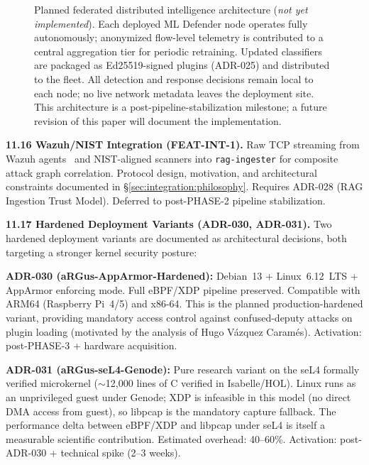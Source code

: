 \documentclass[11pt,a4paper]{article}
\begin{document}
\begin{figure}[ht]
        \caption{Planned federated distributed intelligence architecture (\emph{not yet implemented}).
        Each deployed ML Defender node operates fully autonomously; anonymized flow-level telemetry
        is contributed to a central aggregation tier for periodic retraining. Updated classifiers
        are packaged as Ed25519-signed plugins (ADR-025) and distributed to the fleet. All detection
        and response decisions remain local to each node; no live network metadata leaves the
        deployment site. This architecture is a post-pipeline-stabilization milestone; a future
        revision of this paper will document the implementation.}
        \label{fig:federated}
    \end{figure}

    \textbf{11.16 Wazuh/NIST Integration (FEAT-INT-1).}
    Raw TCP streaming from Wazuh agents~\cite{wazuh2024} and NIST-aligned
    scanners into \texttt{rag-ingester} for composite attack graph correlation.
    Protocol design, motivation, and architectural constraints documented in
    \S\ref{sec:integration:philosophy}. Requires ADR-028 (RAG Ingestion Trust
    Model). Deferred to post-PHASE-2 pipeline stabilization.

    \textbf{11.17 Hardened Deployment Variants (ADR-030, ADR-031).}
    \label{sec:future:hardened}
    Two hardened deployment variants are documented as architectural decisions, both
    targeting a stronger kernel security posture:

    \textbf{ADR-030 (aRGus-AppArmor-Hardened):} Debian~13 + Linux~6.12~LTS +
    AppArmor enforcing mode. Full eBPF/XDP pipeline preserved. Compatible with ARM64
    (Raspberry Pi~4/5) and x86-64. This is the planned production-hardened variant,
    providing mandatory access control against confused-deputy attacks on plugin
    loading (motivated by the analysis of Hugo V\'azquez Caram\'es). Activation:
    post-PHASE-3 + hardware acquisition.

    \textbf{ADR-031 (aRGus-seL4-Genode):} Pure research variant on the seL4
    formally verified microkernel (${\sim}$12,000 lines of C verified in
    Isabelle/HOL). Linux runs as an unprivileged guest under Genode; XDP is
    infeasible in this model (no direct DMA access from guest), so libpcap is the
    mandatory capture fallback. The performance delta between eBPF/XDP and libpcap
    under seL4 is itself a measurable scientific contribution. Estimated overhead:
    40--60\%. Activation: post-ADR-030 + technical spike (2--3 weeks).
\end{document}
